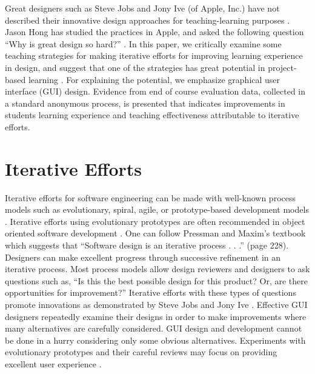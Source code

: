 \documentclass{article}
\begin{document}
Great designers such as Steve Jobs and Jony Ive (of Apple, Inc.) have not described their innovative design approaches for teaching-learning purposes \cite{isaacson}.  Jason Hong has studied the practices in Apple, and asked the following question ``Why is great design so hard?'' \cite{hong}. In this paper, we critically examine some teaching strategies for making iterative efforts for improving learning experience in design, and suggest that one of the strategies has great potential in project-based learning \cite{guo}. For explaining the potential, we emphasize graphical user interface (GUI) design. Evidence from end of course evaluation data, collected in a standard anonymous process, is presented that indicates improvements in students learning experience and teaching effectiveness attributable to iterative efforts.

\section{Iterative Efforts}
Iterative efforts for software engineering can be made with well-known process models such as evolutionary, spiral, agile, or prototype-based development 
models \cite{braude, giacomin, kung, ouster, pfleeger, pressman, rumbaugh, shneiderman, sommerville}. Iterative efforts using evolutionary prototypes are often recommended in object oriented software development \cite{kung, rumbaugh}.  One can follow Pressman and Maxim’s textbook which suggests that ``Software design is an iterative process . . .'' \cite{pressman} (page 228).  Designers can make excellent progress through successive refinement in 
an iterative process. Most process models allow design reviewers and designers to ask questions such as, ``Is this the best possible design for this product? Or, are there opportunities for improvement?''  Iterative efforts with these types of questions promote innovations as demonstrated by Steve Jobs and Jony Ive \cite{isaacson}.  Effective GUI designers repeatedly examine their designs in order to make improvements where many alternatives are carefully considered. GUI design and development cannot be done in a hurry considering only some obvious alternatives.  Experiments with evolutionary prototypes and their careful reviews may focus on providing excellent user 
experience \cite{kung, pressman}.
\end{document}
